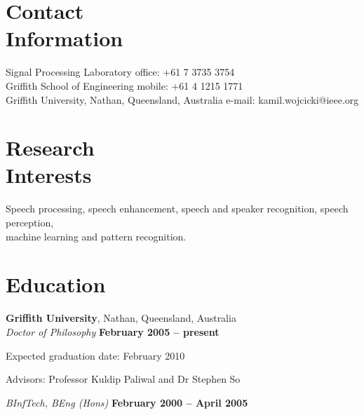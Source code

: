 \documentclass[margin,line]{resumeFormat2}
\begin{document}
\begin{resumeFormat2}

    \section{\mysidestyle Contact\\Information}

    Signal Processing Laboratory                            \hfill office: +61 7 3735 3754          \vspace{0mm}\\\vspace{0mm}%
    Griffith School of Engineering                          \hfill mobile: +61 4 1215 1771          \vspace{0mm}\\\vspace{0mm}%
    Griffith University, Nathan, Queensland, Australia      \hfill e-mail: kamil.wojcicki@ieee.org  \vspace{0mm}\\\vspace{-4.5mm}%


    \section{\mysidestyle Research\\Interests}

    Speech processing, speech enhancement, speech and speaker recognition, speech perception, \\ 
    machine learning and pattern recognition.


    \section{\mysidestyle Education}

    \textbf{Griffith University}, Nathan, Queensland, Australia \vspace{2mm}\\\vspace{1mm}%
    \textsl{Doctor of Philosophy} \hfill \textbf{ February 2005 -- present}\vspace{-3mm}\\\vspace{-1mm}%
    \begin{list2}
        \item Expected graduation date: February 2010
        \item Advisors:  Professor Kuldip Paliwal and Dr Stephen So
    \end{list2}\vspace{-1.5mm}
    \textsl{BInfTech, BEng (Hons)} \hfill \textbf{February 2000 -- April 2005}\vspace{-3mm}\\\vspace{-1mm}%



\end{resumeFormat2}
\end{document}
